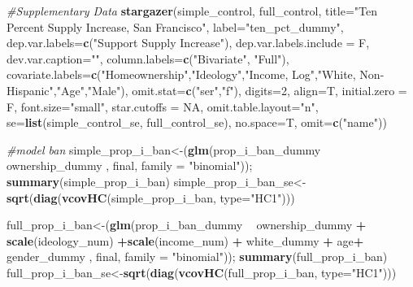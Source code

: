 \documentclass[]{article}
\newenvironment{Shaded}{\begin{snugshade}}{\end{snugshade}}
\newcommand{\CommentTok}[1]{\textcolor[rgb]{0.56,0.35,0.01}{\textit{#1}}}
\newcommand{\DataTypeTok}[1]{\textcolor[rgb]{0.13,0.29,0.53}{#1}}
\newcommand{\DecValTok}[1]{\textcolor[rgb]{0.00,0.00,0.81}{#1}}
\newcommand{\KeywordTok}[1]{\textcolor[rgb]{0.13,0.29,0.53}{\textbf{#1}}}
\newcommand{\NormalTok}[1]{#1}
\newcommand{\OperatorTok}[1]{\textcolor[rgb]{0.81,0.36,0.00}{\textbf{#1}}}
\newcommand{\OtherTok}[1]{\textcolor[rgb]{0.56,0.35,0.01}{#1}}
\newcommand{\StringTok}[1]{\textcolor[rgb]{0.31,0.60,0.02}{#1}}
\begin{document}
\begin{Shaded}
\begin{Highlighting}[]
\CommentTok{#Supplementary Data}
\KeywordTok{stargazer}\NormalTok{(simple_control, full_control, }\DataTypeTok{title=}\StringTok{"Ten Percent Supply Increase, San Francisco"}\NormalTok{,  }\DataTypeTok{label=}\StringTok{"ten_pct_dummy"}\NormalTok{, }
          \DataTypeTok{dep.var.labels=}\KeywordTok{c}\NormalTok{(}\StringTok{"Support Supply Increase"}\NormalTok{), }\DataTypeTok{dep.var.labels.include =}\NormalTok{ F, }\DataTypeTok{dev.var.caption=}\StringTok{""}\NormalTok{,}
          \DataTypeTok{column.labels=}\KeywordTok{c}\NormalTok{(}\StringTok{"Bivariate"}\NormalTok{, }\StringTok{"Full"}\NormalTok{),}
          \DataTypeTok{covariate.labels=}\KeywordTok{c}\NormalTok{(}\StringTok{"Homeownership"}\NormalTok{,}\StringTok{"Ideology"}\NormalTok{,}\StringTok{"Income, Log"}\NormalTok{,}\StringTok{"White, Non-Hispanic"}\NormalTok{,}\StringTok{"Age"}\NormalTok{,}\StringTok{"Male"}\NormalTok{),}
          \DataTypeTok{omit.stat=}\KeywordTok{c}\NormalTok{(}\StringTok{"ser"}\NormalTok{,}\StringTok{"f"}\NormalTok{), }\DataTypeTok{digits=}\DecValTok{2}\NormalTok{, }\DataTypeTok{align=}\NormalTok{T,}
          \DataTypeTok{initial.zero =}\NormalTok{ F, }\DataTypeTok{font.size=}\StringTok{"small"}\NormalTok{, }\DataTypeTok{star.cutoffs =} \OtherTok{NA}\NormalTok{, }\DataTypeTok{omit.table.layout=}\StringTok{"n"}\NormalTok{,}
          \DataTypeTok{se=}\KeywordTok{list}\NormalTok{(simple_control_se, full_control_se), }\DataTypeTok{no.space=}\NormalTok{T, }\DataTypeTok{omit=}\KeywordTok{c}\NormalTok{(}\StringTok{"name"}\NormalTok{))}


\CommentTok{#model ban}
\NormalTok{simple_prop_i_ban<-(}\KeywordTok{glm}\NormalTok{(prop_i_ban_dummy }\OperatorTok{~}\StringTok{ }\NormalTok{ownership_dummy  , final, }\DataTypeTok{family =} \StringTok{"binomial"}\NormalTok{)); }\KeywordTok{summary}\NormalTok{(simple_prop_i_ban)}
\NormalTok{simple_prop_i_ban_se<-}\KeywordTok{sqrt}\NormalTok{(}\KeywordTok{diag}\NormalTok{(}\KeywordTok{vcovHC}\NormalTok{(simple_prop_i_ban, }\DataTypeTok{type=}\StringTok{"HC1"}\NormalTok{)))}

\NormalTok{full_prop_i_ban<-(}\KeywordTok{glm}\NormalTok{(prop_i_ban_dummy }\OperatorTok{~}\StringTok{ }\NormalTok{ownership_dummy  }\OperatorTok{+}\StringTok{  }\KeywordTok{scale}\NormalTok{(ideology_num) }\OperatorTok{+}\KeywordTok{scale}\NormalTok{(income_num) }\OperatorTok{+}\StringTok{ }\NormalTok{white_dummy  }\OperatorTok{+}\StringTok{ }\NormalTok{age}\OperatorTok{+}\StringTok{ }\NormalTok{gender_dummy , final, }\DataTypeTok{family =} \StringTok{"binomial"}\NormalTok{)); }\KeywordTok{summary}\NormalTok{(full_prop_i_ban)}
\NormalTok{full_prop_i_ban_se<-}\KeywordTok{sqrt}\NormalTok{(}\KeywordTok{diag}\NormalTok{(}\KeywordTok{vcovHC}\NormalTok{(full_prop_i_ban, }\DataTypeTok{type=}\StringTok{"HC1"}\NormalTok{)))}


\end{Highlighting}
\end{Shaded}
\end{document}
